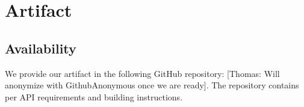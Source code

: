 \documentclass[acmsmall, manuscript, screen, review, anonymous]{acmart}
\newcommand{\thomas}[1]{{\footnotesize\color{orange}[Thomas: #1]}}
\begin{document}
\begin{acks}
\end{acks}




\clearpage
\appendix
\section{Artifact}
\subsection{Availability}
We provide our artifact in the following GitHub repository: \thomas{Will anonymize with GithubAnonymous once we are ready}. The repository contains per API requirements and building instructions.
\end{document}
